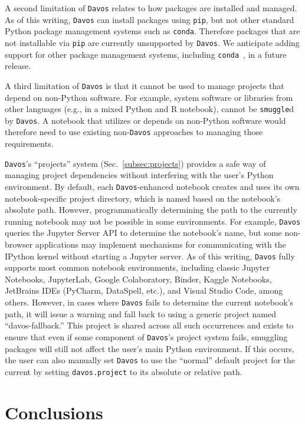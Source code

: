 \documentclass[preprint,12pt,a4paper]{elsarticle}
\begin{document}
A second limitation of \texttt{Davos} relates to how packages are installed and managed.
As of this writing, \texttt{Davos} can install packages using \texttt{pip}, but not
other standard Python package management systems such as \texttt{conda}.
Therefore packages that are not installable via \texttt{pip} are currently
unsupported by \texttt{Davos}. We anticipate adding support for other package management
systems, including \texttt{conda}~\cite{Anac12}, in a future release.

A third limitation of \texttt{Davos} is that it cannot be used to manage projects that
depend on non-Python software. For example, system software or libraries from
other languages (e.g., in a mixed Python and R notebook), cannot be
\texttt{smuggle}d by \texttt{Davos}. A notebook that utilizes or depends on non-Python
software would therefore need to use existing non-\texttt{Davos} approaches to managing
those requirements.

\texttt{Davos}'s ``projects'' system (Sec.~\ref{subsec:projects}) provides a safe way
of managing project dependencies without interfering with the user's Python
environment. By default, each \texttt{Davos}-enhanced notebook creates and uses its own
notebook-specific project directory, which is named based on the notebook's absolute
path. However, programmatically determining the path to the currently running
notebook may not be possible in some environments.
For example, \texttt{Davos} queries the Jupyter Server API to determine the notebook's name, but some non-browser applications may implement mechanisms for communicating with the IPython kernel without starting a Jupyter server.
As of this writing, \texttt{Davos} fully supports most common notebook environments, including classic Jupyter Notebooks,
JupyterLab, Google Colaboratory, Binder, Kaggle Notebooks, JetBrains IDEs (PyCharm, DataSpell, etc.), and Visual Studio Code, among others.
However, in cases where \texttt{Davos} fails to determine the current notebook's path, it will issue a warning and fall back to using a generic project named ``davos-fallback.'' This project is shared across all such occurrences and exists to ensure that even if some component of \texttt{Davos}'s project system fails, smuggling packages will still not affect the user's main Python environment. If this occurs, the user can also manually set \texttt{Davos} to use the ``normal'' default project for the current by setting \texttt{davos.project} to its absolute or relative path.


\section{Conclusions}
\end{document}
